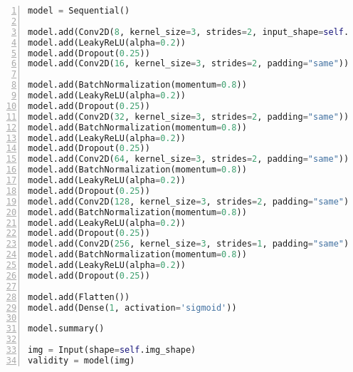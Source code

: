 
\lstset{basicstyle=\footnotesize\ttfamily,breaklines=true}
\begin{lstlisting}[language=Python,numbers=left,frame=tb,caption=Discriminator source code,label=lst:dis]
model = Sequential()

model.add(Conv2D(8, kernel_size=3, strides=2, input_shape=self.img_shape, padding="same"))
model.add(LeakyReLU(alpha=0.2))
model.add(Dropout(0.25))
model.add(Conv2D(16, kernel_size=3, strides=2, padding="same"))
        
model.add(BatchNormalization(momentum=0.8))
model.add(LeakyReLU(alpha=0.2))
model.add(Dropout(0.25))
model.add(Conv2D(32, kernel_size=3, strides=2, padding="same"))
model.add(BatchNormalization(momentum=0.8))
model.add(LeakyReLU(alpha=0.2))
model.add(Dropout(0.25))
model.add(Conv2D(64, kernel_size=3, strides=2, padding="same"))
model.add(BatchNormalization(momentum=0.8))
model.add(LeakyReLU(alpha=0.2))
model.add(Dropout(0.25))
model.add(Conv2D(128, kernel_size=3, strides=2, padding="same"))
model.add(BatchNormalization(momentum=0.8))
model.add(LeakyReLU(alpha=0.2))
model.add(Dropout(0.25))
model.add(Conv2D(256, kernel_size=3, strides=1, padding="same"))
model.add(BatchNormalization(momentum=0.8))
model.add(LeakyReLU(alpha=0.2))
model.add(Dropout(0.25))

model.add(Flatten())
model.add(Dense(1, activation='sigmoid'))

model.summary()

img = Input(shape=self.img_shape)
validity = model(img)

\end{lstlisting}